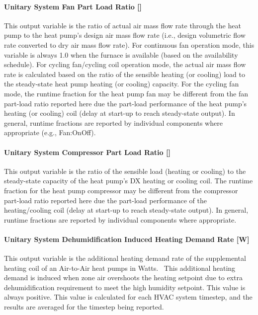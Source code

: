 \paragraph{Unitary System Fan Part Load Ratio {[]}}\label{unitary-system-fan-part-load-ratio-3}

This output variable is the ratio of actual air mass flow rate through the heat pump to the heat pump's design air mass flow rate (i.e., design volumetric flow rate converted to dry air mass flow rate). For continuous fan operation mode, this variable is always 1.0 when the furnace is available (based on the availability schedule). For cycling fan/cycling coil operation mode, the actual air mass flow rate is calculated based on the ratio of the sensible heating (or cooling) load to the steady-state heat pump heating (or cooling) capacity. For the cycling fan mode, the runtime fraction for the heat pump fan may be different from the fan part-load ratio reported here due the part-load performance of the heat pump's heating (or cooling) coil (delay at start-up to reach steady-state output). In general, runtime fractions are reported by individual components where appropriate (e.g., Fan:OnOff).

\paragraph{Unitary System Compressor Part Load Ratio {[]}}\label{unitary-system-compressor-part-load-ratio-2}

This output variable is the ratio of the sensible load (heating or cooling) to the steady-state capacity of the heat pump's DX heating or cooling coil. The runtime fraction for the heat pump compressor may be different from the compressor part-load ratio reported here due the part-load performance of the heating/cooling coil (delay at start-up to reach steady-state output). In general, runtime fractions are reported by individual components where appropriate.

\paragraph{Unitary System Dehumidification Induced Heating Demand Rate {[}W{]}}\label{unitary-system-dehumidification-induced-heating-demand-rate-w}

This output variable is the additional heating demand rate of the supplemental heating coil of an Air-to-Air heat pumps in Watts.~ This additional heating demand is induced when zone air overshoots the heating setpoint due to extra dehumidification requirement to meet the high humidity setpoint. This value is always positive. This value is calculated for each HVAC system timestep, and the results are averaged for the timestep being reported.

